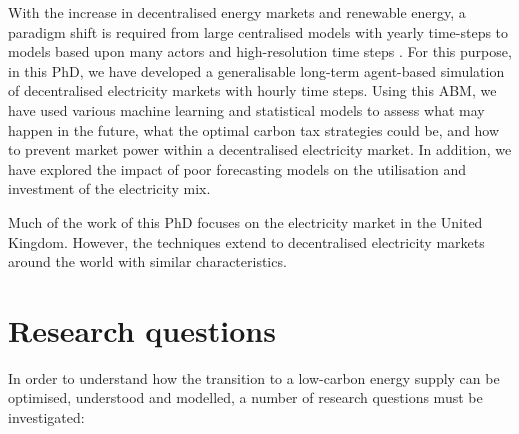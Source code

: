With the increase in decentralised energy markets and renewable energy, a paradigm shift is required from large centralised models with yearly time-steps to models based upon many actors and high-resolution time steps \cite{Pfenninger2014b, Ringkjob2018}. For this purpose, in this PhD, we have developed a generalisable long-term agent-based simulation of decentralised electricity markets with hourly time steps. Using this \gls{ABM}, we have used various machine learning and statistical models to assess what may happen in the future, what the optimal carbon tax strategies could be, and how to prevent market power within a decentralised electricity market. In addition, we have explored the impact of poor forecasting models on the utilisation and investment of the electricity mix. 

Much of the work of this PhD focuses on the electricity market in the United Kingdom. However, the techniques extend to decentralised electricity markets around the world with similar characteristics. 









\section{Research questions}


In order to understand how the transition to a low-carbon energy supply can be optimised, understood and modelled, a number of research questions must be investigated:

